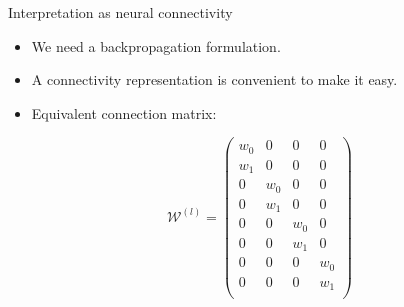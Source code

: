 \documentclass{beamer}
\begin{document}
\begin{frame}{Interpretation as neural connectivity}
\begin{multicols}{2}
\begin{itemize}
    \item We need a backpropagation formulation.
    \item A connectivity representation is convenient to make it easy. 
    \item Equivalent connection matrix:
\end{itemize} 
\begin{equation}
    \mathcal{W}^{(l)}=\left(
    \begin{array}{cccc}
    w_0 & 0 & 0 & 0\\
    w_1 & 0 & 0 & 0\\
    0& w_0 &  0 & 0\\
    0& w_1 &  0 & 0\\
    0 & 0 & w_0&  0\\
    0 & 0 & w_1&  0\\
    0 & 0 & 0 & w_0\\
    0 & 0 & 0 & w_1\\
    \end{array}
    \right)
\end{equation}
\end{multicols}
\end{frame}
\end{document}

